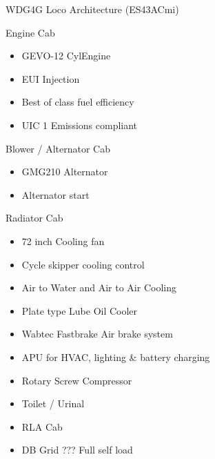 \documentclass[
  ignorenonframetext,
]{beamer}
\providecommand{\tightlist}{%
  \setlength{\itemsep}{0pt}\setlength{\parskip}{0pt}}
\begin{document}
\begin{frame}{WDG4G Loco Architecture (ES43ACmi)}
\begin{block}{Engine Cab}
\protect\hypertarget{engine-cab}{}
\begin{itemize}[<+->]
\tightlist
\item
  GEVO-12 CylEngine
\item
  EUI Injection
\item
  Best of class fuel efficiency
\item
  UIC 1 Emissions compliant
\end{itemize}
\end{block}

\begin{block}{Blower / Alternator Cab}
\protect\hypertarget{blower-alternator-cab}{}
\begin{itemize}[<+->]
\tightlist
\item
  GMG210 Alternator
\item
  Alternator start
\end{itemize}
\end{block}

\begin{block}{Radiator Cab}
\protect\hypertarget{radiator-cab}{}
\begin{itemize}[<+->]
\item
  72 inch Cooling fan
\item
  Cycle skipper cooling control
\item
  Air to Water and Air to Air Cooling
\item
  Plate type Lube Oil Cooler
\item
  Wabtec Fastbrake Air brake system
\item
  APU for HVAC, lighting \& battery charging
\item
  Rotary Screw Compressor
\item
  Toilet / Urinal
\item
  RLA Cab
\item
  DB Grid ??? Full self load
\end{itemize}
\end{block}


\end{frame}
\end{document}
